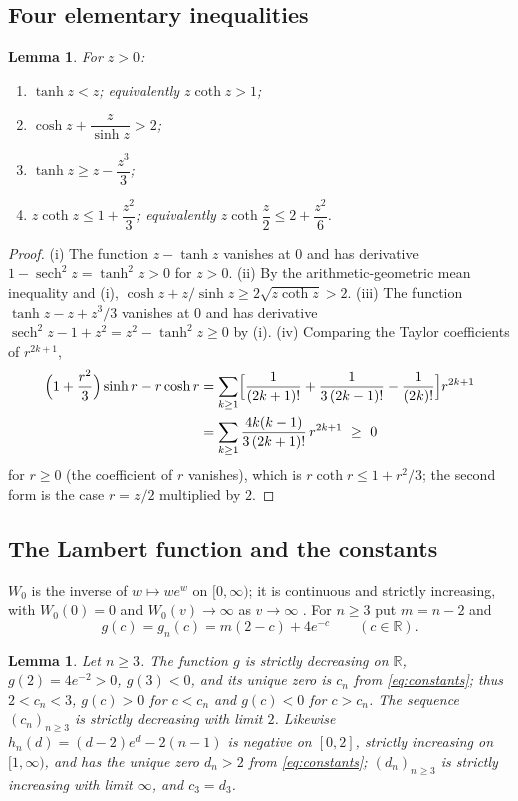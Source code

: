 \documentclass[11pt,a4paper]{article}
\theoremstyle{plain}
\newtheorem{lemma}[theorem]{Lemma}
\theoremstyle{definition}
\newcommand{\R}{\mathbb{R}}
\newcommand{\Wl}{W_{0}}
\begin{document}
\subsection{Four elementary inequalities}

\begin{lemma}\label{lem:elementary}
For $z>0$:
\begin{enumerate}
\item[(i)] $\tanh z<z$; equivalently $z\coth z>1$;
\item[(ii)] $\cosh z+\dfrac{z}{\sinh z}>2$;
\item[(iii)] $\tanh z\ge z-\dfrac{z^{3}}{3}$;
\item[(iv)] $z\coth z\le 1+\dfrac{z^{2}}{3}$; equivalently $z\coth\dfrac z2\le 2+\dfrac{z^{2}}{6}$.
\end{enumerate}
\end{lemma}

\begin{proof}
(i) The function $z-\tanh z$ vanishes at $0$ and has derivative $1-\operatorname{sech}^2 z=\tanh^2 z>0$ for $z>0$. (ii) By the arithmetic-geometric mean inequality and (i), $\cosh z+z/\sinh z\ge 2\sqrt{z\coth z}>2$. (iii) The function $\tanh z-z+z^3/3$ vanishes at $0$ and has derivative $\operatorname{sech}^2 z-1+z^2=z^2-\tanh^2 z\ge 0$ by (i). (iv) Comparing the Taylor coefficients of $r^{2k+1}$,
\begin{align*}
\Bigl(1+\frac{r^2}{3}\Bigr)\sinh r-r\cosh r
&=\sum_{k\ge 1}\Bigl[\frac{1}{(2k+1)!}+\frac{1}{3\,(2k-1)!}-\frac{1}{(2k)!}\Bigr]r^{2k+1}\\
&=\sum_{k\ge 1}\frac{4k(k-1)}{3\,(2k+1)!}\,r^{2k+1}\ \ge\ 0
\end{align*}
for $r\ge 0$ (the coefficient of $r$ vanishes), which is $r\coth r\le 1+r^2/3$; the second form is the case $r=z/2$ multiplied by $2$.
\end{proof}

\subsection{The Lambert function and the constants}
$\Wl$ is the inverse of $w\mapsto we^{w}$ on $[0,\infty)$; it is continuous and strictly increasing, with $\Wl(0)=0$ and $\Wl(v)\to\infty$ as $v\to\infty$ \cite{Corless1996}. For $n\ge 3$ put $m=n-2$ and
\begin{equation}\label{eq:g}
g(c)=g_n(c)=m(2-c)+4e^{-c}\qquad(c\in\R).
\end{equation}

\begin{lemma}\label{lem:cn}
Let $n\ge 3$. The function $g$ is strictly decreasing on $\R$, $g(2)=4e^{-2}>0$, $g(3)<0$, and its unique zero is $c_n$ from \eqref{eq:constants}; thus $2<c_n<3$, $g(c)>0$ for $c<c_n$ and $g(c)<0$ for $c>c_n$. The sequence $(c_n)_{n\ge 3}$ is strictly decreasing with limit $2$. Likewise $h_n(d)=(d-2)e^{d}-2(n-1)$ is negative on $[0,2]$, strictly increasing on $[1,\infty)$, and has the unique zero $d_n>2$ from \eqref{eq:constants}; $(d_n)_{n\ge 3}$ is strictly increasing with limit $\infty$, and $c_3=d_3$.
\end{lemma}
\end{document}
